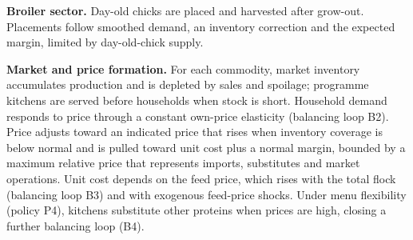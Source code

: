 \documentclass[10pt,twocolumn,a4paper]{article}
\begin{document}
\noindent\textbf{Broiler sector.} Day-old chicks are placed and harvested after grow-out. Placements follow smoothed demand, an inventory correction and the expected margin, limited by day-old-chick supply.


\noindent\textbf{Market and price formation.} For each commodity, market inventory accumulates production and is depleted by sales and spoilage; programme kitchens are served before households when stock is short. Household demand responds to price through a constant own-price elasticity (balancing loop B2). Price adjusts toward an indicated price that rises when inventory coverage is below normal and is pulled toward unit cost plus a normal margin, bounded by a maximum relative price that represents imports, substitutes and market operations. Unit cost depends on the feed price, which rises with the total flock (balancing loop B3) and with exogenous feed-price shocks. Under menu flexibility (policy P4), kitchens substitute other proteins when prices are high, closing a further balancing loop (B4).
\end{document}
